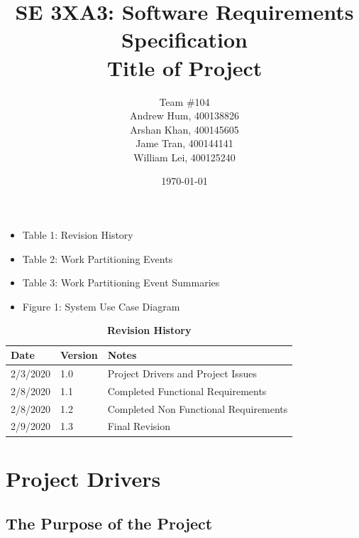 \documentclass[12pt, titlepage]{article}
\title{SE 3XA3: Software Requirements Specification\\Title of Project}
\author{Team \#104
		\\ Andrew Hum, 400138826
		\\ Arshan Khan, 400145605
		\\ Jame Tran, 400144141
		\\ William Lei, 400125240
}
\date{\today}
\begin{document}
\maketitle

\tableofcontents
\listoftables

\begin{itemize}
\item Table 1: Revision History
\item Table 2: Work Partitioning Events
\item Table 3: Work Partitioning Event Summaries
\end{itemize}

\listoffigures

\begin{itemize}
    \item Figure 1: System Use Case Diagram
\end{itemize}

\begin{table}[bp]
\caption{\bf Revision History}
\begin{tabularx}{\textwidth}{p{3cm}p{2cm}X}
\toprule {\bf Date} & {\bf Version} & {\bf Notes}\\
\midrule
2/3/2020 & 1.0 & Project Drivers and Project Issues\\
2/8/2020 & 1.1 & Completed Functional Requirements\\
2/8/2020 & 1.2 & Completed Non Functional Requirements\\
2/9/2020 & 1.3 & Final Revision\\

\bottomrule
\end{tabularx}
\end{table}

\newpage



\section{Project Drivers}

\subsection{The Purpose of the Project}
\end{document}
